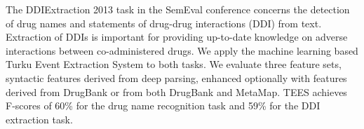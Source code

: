The DDIExtraction 2013 task in the SemEval conference concerns the detection of drug names and statements of drug-drug interactions (DDI) from text. Extraction
 of DDIs is important for providing up-to-date knowledge on adverse interactions
 between co-administered drugs. We apply the machine learning based Turku Event
 Extraction System to both tasks. We evaluate three feature sets,
 syntactic features derived from deep parsing, enhanced optionally with features
 derived from DrugBank or from both DrugBank and MetaMap. TEES achieves F-scores
 of 60\% for the drug name recognition task and 59\% for the DDI extraction task.

